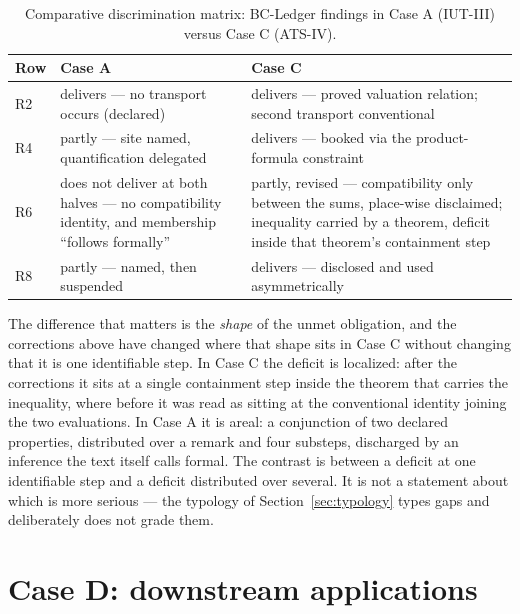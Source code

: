 \documentclass[11pt,a4paper]{article}
\theoremstyle{definition}
\begin{document}
\begin{table}[htbp]
\centering
\small
\renewcommand{\arraystretch}{1.12}
\begin{tabular}{@{}lP{0.40\textwidth}P{0.40\textwidth}@{}}
\toprule
Row & Case A & Case C \\
\midrule
R2 & delivers --- no transport occurs (declared) & delivers --- proved valuation
  relation; second transport conventional \\
R4 & partly --- site named, quantification delegated & delivers --- booked via the
  product-formula constraint \\
R6 & does not deliver at both halves --- no compatibility identity, and
  membership ``follows formally'' & partly, revised --- compatibility only
  between the sums, place-wise disclaimed; inequality carried by a theorem,
  deficit inside that theorem's containment step \\
R8 & partly --- named, then suspended & delivers --- disclosed and used
  asymmetrically \\
\bottomrule
\end{tabular}
\caption{Comparative discrimination matrix: BC-Ledger findings in Case A (IUT-III) versus Case C (ATS-IV).}
\label{tab:case_a_c_comparison}
\end{table}

The difference that matters is the \emph{shape} of the unmet obligation, and the
corrections above have changed where that shape sits in Case C without changing
that it is one identifiable step. In Case C the deficit is localized: after the
corrections it sits at a single containment step inside the theorem that carries
the inequality, where before it was read as sitting at the conventional identity
joining the two evaluations. In Case A it is areal: a conjunction of two declared
properties, distributed over a remark and four substeps, discharged by an inference
the text itself calls formal. The contrast is between a deficit at one identifiable
step and a deficit distributed over several. It is not a statement about which is
more serious --- the typology of Section~\ref{sec:typology} types gaps and
deliberately does not grade them.

\section{Case D: downstream applications}
\label{sec:caseD}
\end{document}
